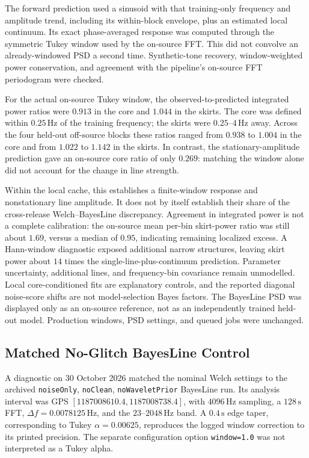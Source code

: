 The forward prediction used a sinusoid with that training-only frequency
and amplitude trend, including its within-block envelope, plus an estimated
local continuum. Its exact phase-averaged response was computed through
the symmetric Tukey window used by the on-source FFT. This did not convolve
an already-windowed PSD a second time. Synthetic-tone recovery,
window-weighted power conservation, and agreement with the pipeline's
on-source FFT periodogram were checked.

For the actual on-source Tukey window, the observed-to-predicted integrated
power ratios were $0.913$ in the core and $1.044$ in the skirts. The core
was defined within $0.25\,\mathrm{Hz}$ of the training frequency; the skirts
were $0.25$--$4\,\mathrm{Hz}$ away. Across the four held-out off-source
blocks these ratios ranged from $0.938$ to $1.004$ in the core and from
$1.022$ to $1.142$ in the skirts. In contrast, the stationary-amplitude
prediction gave an on-source core ratio of only $0.269$: matching the window
alone did not account for the change in line strength.

Within the local cache, this establishes a finite-window response and
nonstationary line amplitude. It does not by itself establish their share
of the cross-release Welch--BayesLine discrepancy. Agreement in
integrated power is not a complete calibration: the on-source mean
per-bin skirt-power ratio was still about $1.69$, versus a median of
$0.95$, indicating remaining localized excess. A Hann-window diagnostic
exposed additional narrow structures, leaving skirt power about $14$ times
the single-line-plus-continuum prediction. Parameter uncertainty,
additional lines, and frequency-bin covariance remain unmodelled. Local
core-conditioned fits are explanatory controls, and the reported diagonal
noise-score shifts are not model-selection Bayes factors. The BayesLine PSD
was displayed only as an on-source reference, not as an independently
trained held-out model. Production windows, PSD settings, and queued jobs
were unchanged.

\subsection{Matched No-Glitch BayesLine Control}

A diagnostic on 30 October 2026 matched the nominal Welch settings to the
archived \texttt{noiseOnly}, \texttt{noClean}, \texttt{noWaveletPrior}
BayesLine run. Its analysis interval was GPS
$[1187008610.4,1187008738.4]$, with $4096\,\mathrm{Hz}$ sampling,
a $128\,\mathrm{s}$ FFT, $\Delta f=0.0078125\,\mathrm{Hz}$, and the
$23$--$2048\,\mathrm{Hz}$ band. A $0.4\,\mathrm{s}$ edge taper,
corresponding to Tukey $\alpha=0.00625$, reproduces the logged window
correction to its printed precision. The separate configuration option
\texttt{window=1.0} was not interpreted as a Tukey alpha.

